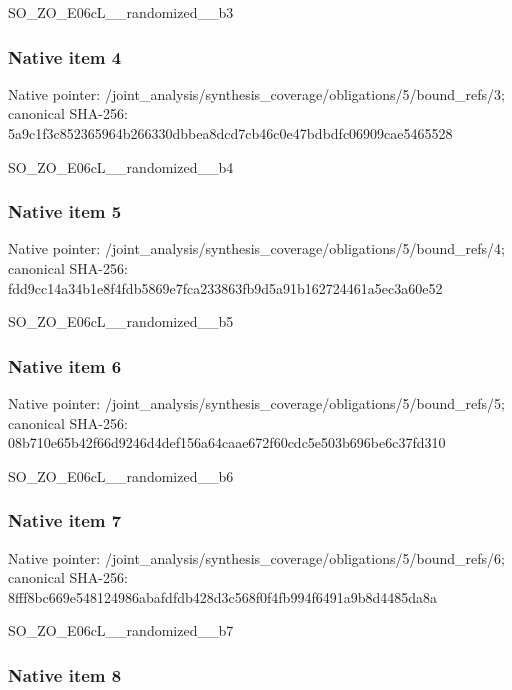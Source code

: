 \documentclass[10pt,a4paper]{article}
\begin{document}
SO\_ZO\_E06cL\_\_randomized\_\_b3


\subsubsection{Native item 4}


Native pointer: /joint\_analysis/synthesi\allowbreak{}s\_coverage/obligations/5\allowbreak{}/bound\_refs/3; canonical SHA-256: 5a9c1f3c852365964b266330\allowbreak{}dbbea8dcd7cb46c0e47bdbdf\allowbreak{}c06909cae5465528


SO\_ZO\_E06cL\_\_randomized\_\_b4


\subsubsection{Native item 5}


Native pointer: /joint\_analysis/synthesi\allowbreak{}s\_coverage/obligations/5\allowbreak{}/bound\_refs/4; canonical SHA-256: fdd9cc14a34b1e8f4fdb5869\allowbreak{}e7fca233863fb9d5a91b1627\allowbreak{}24461a5ec3a60e52


SO\_ZO\_E06cL\_\_randomized\_\_b5


\subsubsection{Native item 6}


Native pointer: /joint\_analysis/synthesi\allowbreak{}s\_coverage/obligations/5\allowbreak{}/bound\_refs/5; canonical SHA-256: 08b710e65b42f66d9246d4de\allowbreak{}f156a64caae672f60cdc5e50\allowbreak{}3b696be6c37fd310


SO\_ZO\_E06cL\_\_randomized\_\_b6


\subsubsection{Native item 7}


Native pointer: /joint\_analysis/synthesi\allowbreak{}s\_coverage/obligations/5\allowbreak{}/bound\_refs/6; canonical SHA-256: 8fff8bc669e548124986abaf\allowbreak{}dfdb428d3c568f0f4fb994f6\allowbreak{}491a9b8d4485da8a


SO\_ZO\_E06cL\_\_randomized\_\_b7


\subsubsection{Native item 8}
\end{document}
